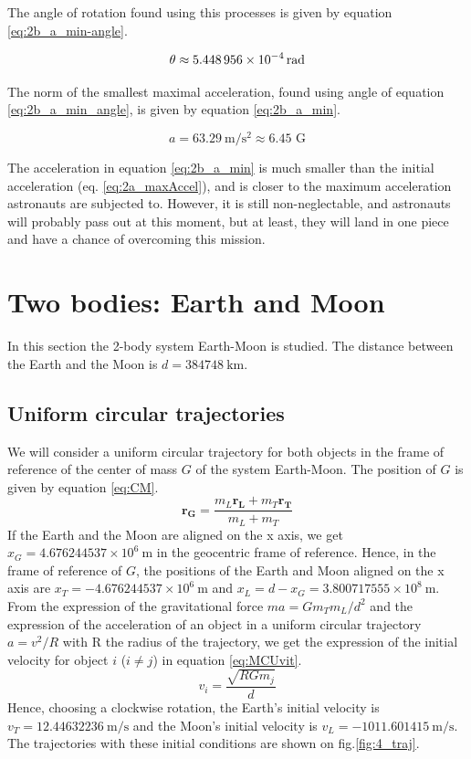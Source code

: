 \documentclass[a4paper,12pt,twoside]{article}
\begin{document}
The angle of rotation found using this processes is given by equation \eqref{eq:2b_a_min-angle}.

\begin{equation}
  \theta \approx \SI{5.448956d-4}{\radian} %
  \label{eq:2b_a_min_angle}
\end{equation}

The norm of the smallest maximal acceleration, found using angle of equation \eqref{eq:2b_a_min_angle}, is given by equation \eqref{eq:2b_a_min}.

\begin{equation}
  a = \SI{63.29}{\meter\per\square\second} \approx \num{6.45}\text{ G} %
  \label{eq:2b_a_min}
\end{equation}

The acceleration in equation \eqref{eq:2b_a_min} is much smaller than the initial acceleration (eq. \eqref{eq:2a_maxAccel}), and is closer to the maximum acceleration astronauts are subjected to.
However, it is still non-neglectable, and astronauts will probably pass out at this moment, but at least, they will land in one piece and have a chance of overcoming this mission.

\section{Two bodies: Earth and Moon}
In this section the 2-body system Earth-Moon is studied. The distance between the Earth and the Moon is $d = 384748 ~\si{\km}$.

\subsection{Uniform circular trajectories}
We will consider a uniform circular trajectory for both objects in the frame of reference of the center of mass $G$ of the system Earth-Moon. The position of $G$ is given by equation \eqref{eq:CM}.
\begin{equation}
\mathbf{r_G} = \frac{m_L \mathbf{r_L} + m_T \mathbf{r_T}}{m_L + m_T}
\label{eq:CM}
\end{equation}
If the Earth and the Moon are aligned on the x axis, we get $x_G = 4.676244537 \times 10^6 ~\si{\m}$ in the geocentric frame of reference. Hence, in the frame of reference of $G$, the positions of the Earth and Moon aligned on the x axis are $x_T = -4.676244537 \times 10^6 ~\si{\m}$ and $x_L = d-x_G = 3.800717555 \times 10^8 ~\si{\m}$.\\
From the expression of the gravitational force $ma = G m_T m_L/d^2$ and the expression of the acceleration of an object in a uniform circular trajectory $a = v^2/R$ with R the radius of the trajectory, we get the expression of the initial velocity for object $i$ ($i \neq j$) in equation \eqref{eq:MCUvit}.
\begin{equation}
v_i = \frac{\sqrt{RG m_j}}{d}
\label{eq:MCUvit}
\end{equation}
Hence, choosing a clockwise rotation, the Earth's initial velocity is $v_T = 12.44632236 ~\si{\m \per \s}$ and the Moon's initial velocity is $v_L = -1011.601415~\si{\m \per \s}$. The trajectories with these initial conditions are shown on fig.\ref{fig:4_traj}.
\end{document}
